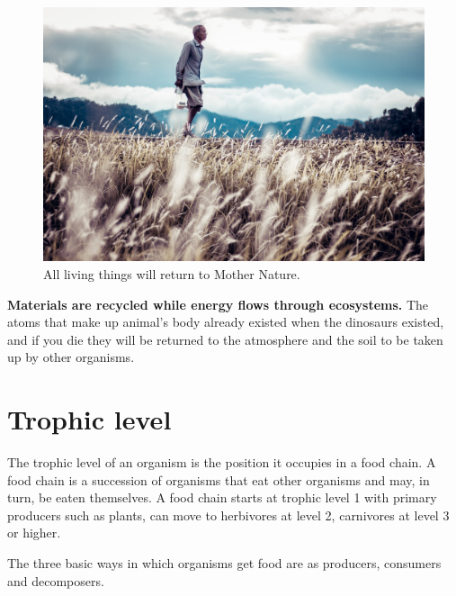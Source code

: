 \documentclass[]{book}
\begin{document}
\begin{figure}

{\centering \includegraphics[width=1\linewidth]{figures/oldman} 

}

\caption{All living things will return to Mother Nature.}\label{fig:oldman}
\end{figure}

\textbf{Materials are recycled while energy flows through ecosystems.}
The atoms that make up animal's body already existed when the dinosaurs
existed, and if you die they will be returned to the atmosphere and the
soil to be taken up by other organisms.

\section{Trophic level}\label{trophic-level}

The trophic level of an organism is the position it occupies in a food
chain. A food chain is a succession of organisms that eat other
organisms and may, in turn, be eaten themselves. A food chain starts at
trophic level 1 with primary producers such as plants, can move to
herbivores at level 2, carnivores at level 3 or higher.

The three basic ways in which organisms get food are as producers,
consumers and decomposers.
\end{document}
